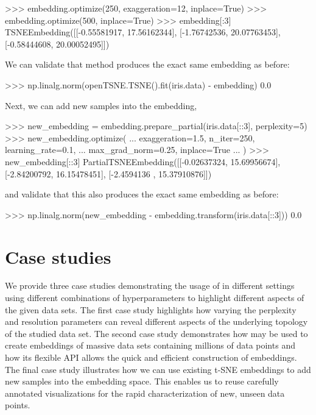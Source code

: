 \documentclass[article]{jss}
\newcommand{\opentsne}{\pkg{openTSNE}\xspace}
\begin{document}
\begin{CodeChunk}
\begin{CodeInput}
>>> embedding.optimize(250, exaggeration=12, inplace=True)
>>> embedding.optimize(500, inplace=True)
>>> embedding[:3]
TSNEEmbedding([[-0.55581917, 17.56162344],
               [-1.76742536, 20.07763453],
               [-0.58444608, 20.00052495]])
\end{CodeInput}
\end{CodeChunk}
We can validate that method produces the exact same embedding as before:
\begin{CodeChunk}
\begin{CodeInput}
>>> np.linalg.norm(openTSNE.TSNE().fit(iris.data) - embedding)
0.0
\end{CodeInput}
\end{CodeChunk}
Next, we can add new samples into the embedding,
\begin{CodeChunk}
\begin{CodeInput}
>>> new_embedding = embedding.prepare_partial(iris.data[::3], perplexity=5)
>>> new_embedding.optimize(
...     exaggeration=1.5, n_iter=250, learning_rate=0.1,
...     max_grad_norm=0.25, inplace=True
... )
>>> new_embedding[::3]
PartialTSNEEmbedding([[-0.02637324, 15.69956674],
                      [-2.84200792, 16.15478451],
                      [-2.4594136 , 15.37910876]])
\end{CodeInput}
\end{CodeChunk}
and validate that this also produces the exact same embedding as before:
\begin{CodeChunk}
\begin{CodeInput}
>>> np.linalg.norm(new_embedding - embedding.transform(iris.data[::3]))
0.0
\end{CodeInput}
\end{CodeChunk}

\section{Case studies} \label{sec:discussion}

We provide three case studies demonstrating the usage of \opentsne in different settings using different combinations of hyperparameters to highlight different aspects of the given data sets.
The first case study highlights how varying the perplexity and resolution parameters can reveal different aspects of the underlying topology of the studied data set.
The second case study demonstrates how \opentsne may be used to create embeddings of massive data sets containing millions of data points and how its flexible API allows the quick and efficient construction of embeddings.
The final case study illustrates how we can use existing t-SNE embeddings to add new samples into the embedding space. This enables us to reuse carefully annotated visualizations for the rapid characterization of new, unseen data points.
\end{document}
